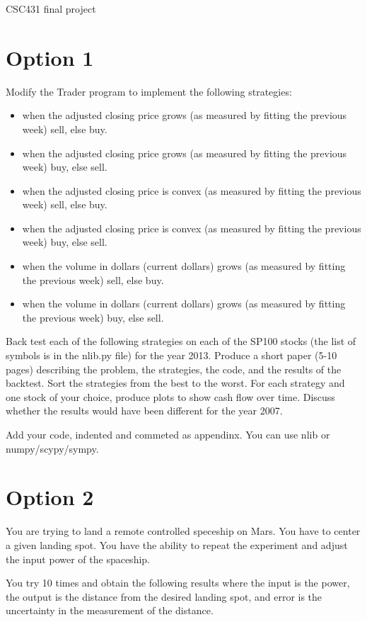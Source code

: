\documentclass[12pt]{article}
\begin{document}
{\LARGE CSC431 final project}

\section{Option 1}

Modify the Trader program to implement the following strategies:

\begin{itemize} 
\item  when the adjusted closing price grows (as measured by fitting the previous week) sell, else buy. 
\item  when the adjusted closing price grows (as measured by fitting the previous week) buy, else sell. 
\item  when the adjusted closing price is convex (as measured by fitting the previous week) sell, else buy. 
\item  when the adjusted closing price is convex (as measured by fitting the previous week) buy, else sell. 
\item  when the volume in dollars (current dollars) grows (as measured by fitting the previous week) sell, else buy. 
\item  when the volume in dollars (current dollars) grows (as measured by fitting the previous week) buy, else sell. 
\end{itemize}
Back test each of the following strategies on each of the SP100 stocks (the list of symbols is in the nlib.py file) for the year 2013. Produce a short paper (5-10 pages) describing the problem, the strategies, the code, and the results of the backtest. Sort the strategies from the best to the worst. For each strategy and one stock of your choice, produce plots to show cash flow over time. Discuss whether the results would have been different for the year 2007.

Add your code, indented and commeted as appendinx. You can use nlib or numpy/scypy/sympy.

\section{Option 2}

You are trying to land a remote controlled speceship on Mars. You have to center a given landing spot.
You have the ability to repeat the experiment and adjust the input power of the spaceship.

You try 10 times and obtain the following results where the input is the power, the output is the distance from the desired landing spot, and error is the uncertainty in the measurement of the distance.
\end{document}
